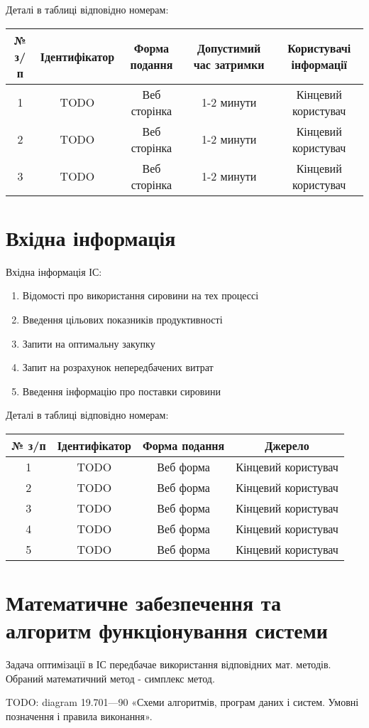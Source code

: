 Деталі в таблиці відповідно номерам:

{\small
\begin{center}
\begin{tabular}{ | c | c | c | c | c | }
\hline
 № з/п  & Ідентифікатор & Форма подання & Допустимий час затримки & Користувачі інформації \\ 
\hline
 1 & TODO & Веб сторінка & 1-2 минути & Кінцевий користувач \\  
\hline
 2 & TODO & Веб сторінка & 1-2 минути & Кінцевий користувач \\  
\hline
 3 & TODO & Веб сторінка & 1-2 минути & Кінцевий користувач \\  
\hline
\end{tabular}
\end{center}
}

\section{Вхідна інформація}

Вхідна інформація ІС: 

\begin{enumerate}
	\item Відомості про використання сировини на тех процессі
	\item Введення цільових показників продуктивності
	\item Запити на оптимальну закупку
	\item Запит на розрахунок непередбачених витрат
	\item Введення інформацію про поставки сировини
\end{enumerate}

Деталі в таблиці відповідно номерам:

{\small
\begin{center}
\begin{tabular}{ | c | c | c | c |  }
\hline
 № з/п  & Ідентифікатор & Форма подання & Джерело \\ 
\hline
 1 & TODO & Веб форма & Кінцевий користувач \\  
\hline
 2 & TODO & Веб форма & Кінцевий користувач \\  
\hline
 3 & TODO & Веб форма & Кінцевий користувач \\  
\hline
 4 & TODO & Веб форма & Кінцевий користувач \\  
\hline
 5 & TODO & Веб форма & Кінцевий користувач \\  
\hline
\end{tabular}
\end{center}
}

\section{Математичне забезпечення та алгоритм функціонування системи}

Задача оптимізації в ІС передбачае використання відповідних мат. методів. Обраний математичний метод - симплекс метод.

TODO: diagram 19.701—90 «Схеми алгоритмів, програм даних і систем. Умовні позначення і правила виконання».


